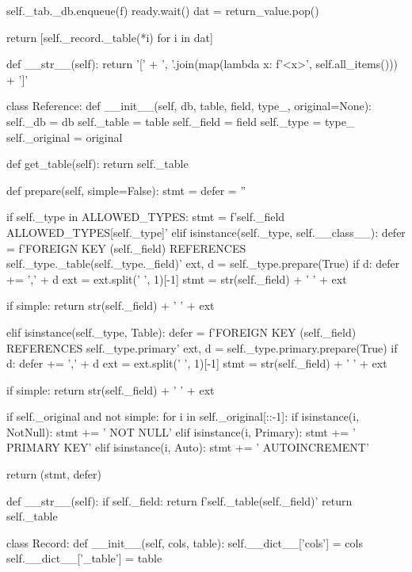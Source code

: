 \begin{pythoncode}
        self._tab._db.enqueue(f)
        ready.wait()
        dat = return_value.pop()

        return [self._record._table(*i) for i in dat]

    def __str__(self):
        return '[' + ', '.join(map(lambda x: f'<{x}>', self.all_items())) + ']'


class Reference:
    def __init__(self, db, table, field, type_, original=None):
        self._db = db
        self._table = table
        self._field = field
        self._type = type_
        self._original = original

    def get_table(self):
        return self._table

    def prepare(self, simple=False):
        stmt = defer = ''

        if self._type in ALLOWED_TYPES:
            stmt = f'{self._field} {ALLOWED_TYPES[self._type]}'
        elif isinstance(self._type, self.__class__):
            defer = f'FOREIGN KEY ({self._field}) REFERENCES {self._type._table}({self._type._field})'
            ext, d = self._type.prepare(True)
            if d:
                defer += ',' + d
            ext = ext.split(' ', 1)[-1]
            stmt = str(self._field) + ' ' + ext

            if simple:
                return str(self._field) + ' ' + ext

        elif isinstance(self._type, Table):
            defer = f'FOREIGN KEY ({self._field}) REFERENCES {self._type.primary}'
            ext, d = self._type.primary.prepare(True)
            if d:
                defer += ',' + d
            ext = ext.split(' ', 1)[-1]
            stmt = str(self._field) + ' ' + ext

            if simple:
                return str(self._field) + ' ' + ext

        if self._original and not simple:
            for i in self._original[::-1]:
                if isinstance(i, NotNull):
                    stmt += ' NOT NULL'
                elif isinstance(i, Primary):
                    stmt += ' PRIMARY KEY'
                elif isinstance(i, Auto):
                    stmt += ' AUTOINCREMENT'

        return (stmt, defer)

    def __str__(self):
        if self._field:
            return f'{self._table}({self._field})'
        return self._table


class Record:
    def __init__(self, cols, table):
        self.__dict__['cols'] = cols
        self.__dict__['_table'] = table


\end{pythoncode}
